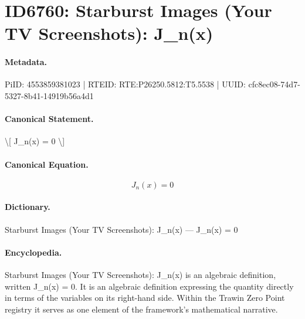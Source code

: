 \section*{ID6760: Starburst Images (Your TV Screenshots): J\_n(x)}
\paragraph{Metadata.}
PiID: 4553859381023 | RTEID: RTE:P26250.5812:T5.5538 | UUID: cfc8ec08-74d7-5327-8b41-14919b56a4d1

\paragraph{Canonical Statement.}
\textbackslash{}[ J\_n(x) = 0 \textbackslash{}]

\paragraph{Canonical Equation.}
\[
J_n(x) = 0
\]

\paragraph{Dictionary.}
Starburst Images (Your TV Screenshots): J\_n(x) — J\_n(x) = 0

\paragraph{Encyclopedia.}
Starburst Images (Your TV Screenshots): J\_n(x) is an algebraic definition, written J\_n(x) = 0. It is an algebraic definition expressing the quantity directly in terms of the variables on its right-hand side. Within the Trawin Zero Point registry it serves as one element of the framework's mathematical narrative.
